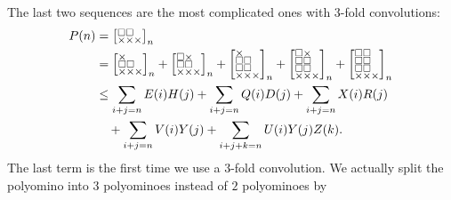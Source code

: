 \documentclass[a4paper,12pt]{article}
\makeatletter
\newenvironment{grid}
  {\begingroup\footnotesize
   \renewcommand{\arraystretch}{0}
   \setlength{\arraycolsep}{0pt}
   \left[\begin{array}{@{}*{10}{c}@{}}}
  {\end{array}\right]\endgroup}
\newcommand{\void}{\phantom{\times}}
\newcommand{\myP}{
    \begin{grid}
        \square & \square & \void \\
        \times & \times & \times
    \end{grid}
}
\makeatother
\begin{document}
		The last two sequences are the most complicated ones with $3$-fold convolutions:
	\begin{align*}
		P(n) &= \myP_n \\
			&= \begin{grid}
			\times & \void & \void \\
			\square & \square & \void \\
			\times & \times & \times
		    \end{grid}_n + \begin{grid}
			\square & \times & \void \\
			\square & \square & \void \\
			\times & \times & \times
		    \end{grid}_n + \begin{grid}
			\times & \void & \void \\
			\square & \square & \void \\
			\square & \square & \void \\
			\times & \times & \times
		    \end{grid}_n + \begin{grid}
			\square & \times & \void \\
			\square & \square & \void \\
			\square & \square & \void \\
			\times & \times & \times
		    \end{grid}_n + \begin{grid}
			\square & \square & \void \\
			\square & \square & \void \\
			\square & \square & \void \\
			\times & \times & \times
		    \end{grid}_n \\
		&\le \sum_{i+j=n} E(i)H(j)
	      + \sum_{i+j=n} Q(i)D(j)
	      + \sum_{i+j=n} X(i)R(j) \\
         &\quad + \sum_{i+j=n} V(i)Y(j)
	      + \sum_{i+j+k=n} U(i)Y(j)Z(k).
	\end{align*}
    The last term is the first time we use a $3$-fold convolution. We actually split the polyomino into $3$ polyominoes instead of $2$ polyominoes by
\end{document}

